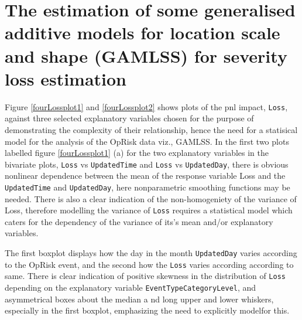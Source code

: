 \documentclass{DissertateUSU}
\begin{document}
\singlespacing

\doublespacing

\section{The estimation of some  generalised additive models for location scale and shape (GAMLSS) for severity loss estimation}
\label{sec:The estimation of some  generalised additive models for location scale and shape (GAMLSS) for severity loss estimation}

Figure \ref{fourLossplot1} and \ref{fourLossplot2} shows plots of the
pnl impact, \texttt{Loss}, against three selected explanatory variables
chosen for the purpose of demonstrating the complexity of their
relationship, hence the need for a statisical model for the analysis of
the OpRisk data viz., GAMLSS. In the first two plots labelled figure
\ref{fourLossplot1} (a) for the two explanatory variables in the
bivariate plots, \texttt{Loss} vs \texttt{UpdatedTime} and \texttt{Loss}
vs \texttt{UpdatedDay}, there is obvious nonlinear dependence between
the mean of the response variable Loss and the \texttt{UpdatedTime} and
\texttt{UpdatedDay}, here nonparametric smoothing functions may be
needed. There is also a clear indication of the non-homogeniety of the
variance of Loss, therefore modelling the variance of \texttt{Loss}
requires a statistical model which caters for the dependency of the
variance of its's mean and/or explanatory variables.\medskip

\singlespacing

\doublespacing

The first boxplot displays how the day in the month \texttt{UpdatedDay}
varies according to the OpRisk event, and the second how the
\texttt{Loss} varies according according to same. There is clear
indication of positive skewness in the distribution of \texttt{Loss}
depending on the explanatory variable \texttt{EventTypeCategoryLevel},
and asymmetrical boxes about the median a nd long upper and lower
whiskers, especially in the first boxplot, emphasizing the need to
explicitly modelfor this.
\end{document}
